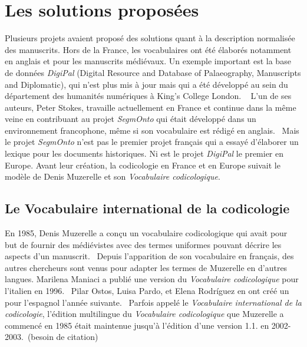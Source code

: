 \documentclass[class=article, crop=false]{standalone}
\begin{document}
\section{Les solutions proposées}

Plusieurs projets avaient proposé des solutions quant à la description normalisée des manuscrits. Hors de la France, les vocabulaires ont été élaborés notamment en anglais et pour les manuscrits médiévaux. Un exemple important est la base de données \textit{DigiPal} (Digital Resource and Database of Palaeography, Manuscripts and Diplomatic), qui n'est plus mis à jour mais qui a été développé au sein du département des humanités numériques à King's College London. ~\autocite{DigiPalDigitalResource2011} L'un de ses auteurs, Peter Stokes, travaille actuellement en France et continue dans la même veine en contribuant au projet \textit{SegmOnto} qui était développé dans un environnement francophone, même si son vocabulaire est rédigé en anglais.~\autocite{gabaySegmOnto2021} Mais le projet \textit{SegmOnto} n'est pas le premier projet français qui a essayé d'élaborer un lexique pour les documents historiques. Ni est le projet \textit{DigiPal} le premier en Europe. Avant leur création, la codicologie en France et en Europe suivait le modèle de Denis Muzerelle et son \textit{Vocabulaire codicologique}.

\subsection{Le Vocabulaire international de la codicologie}

En 1985, Denis Muzerelle a conçu un vocabulaire codicologique qui avait pour but de fournir des médiévistes avec des termes uniformes pouvant décrire les aspects d'un manuscrit.~\autocite{muzerelleVocabulaireCodicologiqueRepertoire1985} Depuis l'apparition de son vocabulaire en français, des autres chercheurs sont venus pour adapter les termes de Muzerelle en d'autres langues. Marilena Maniaci a publié une version du \textit{Vocabulaire codicologique} pour l'italien en 1996.~\autocite{maniaciTerminologiaLibroManoscritto1996} Pilar Ostos, Luisa Pardo, et Elena Rodríguez en ont créé un pour l'espagnol l'année suivante.~\autocite{ostosVocabularioCodicologIaVersion1997} Parfois appelé le \textit{Vocabulaire international de la codicologie}, l'édition multilingue du \textit{Vocabulaire codicologique} que Muzerelle a commencé en 1985 était maintenue jusqu'à l'édition d'une version 1.1. en 2002-2003.~(besoin de citation)
\end{document}
